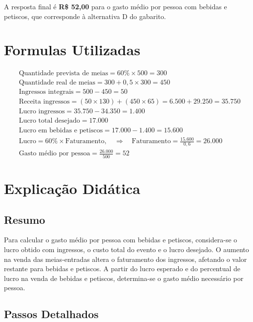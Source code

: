 \documentclass{article}
\begin{document}
A resposta final é \textbf{R\$ 52,00} para o gasto médio por pessoa com bebidas e petiscos, que corresponde à alternativa D do gabarito.

\section*{Formulas Utilizadas}

\begin{align*}
&\text{Quantidade prevista de meias} = 60\% \times 500 = 300 \\[6pt]
&\text{Quantidade real de meias} = 300 + 0{,}5 \times 300 = 450 \\[6pt]
&\text{Ingressos integrais} = 500 - 450 = 50 \\[6pt]
&\text{Receita ingressos} = (50 \times 130) + (450 \times 65) = 6.500 + 29.250 = 35.750 \\[6pt]
&\text{Lucro ingressos} = 35.750 - 34.350 = 1.400 \\[6pt]
&\text{Lucro total desejado} = 17.000 \\[6pt]
&\text{Lucro em bebidas e petiscos} = 17.000 - 1.400 = 15.600 \\[6pt]
&\text{Lucro} = 60\% \times \text{Faturamento}, \quad \Rightarrow \quad \text{Faturamento} = \frac{15.600}{0{,}6} = 26.000 \\[6pt]
&\text{Gasto médio por pessoa} = \frac{26.000}{500} = 52
\end{align*}

\section*{Explicação Didática}

\subsection*{Resumo}

Para calcular o gasto médio por pessoa com bebidas e petiscos, considera-se o lucro obtido com ingressos, o custo total do evento e o lucro desejado. O aumento na venda das meias-entradas altera o faturamento dos ingressos, afetando o valor restante para bebidas e petiscos. A partir do lucro esperado e do percentual de lucro na venda de bebidas e petiscos, determina-se o gasto médio necessário por pessoa.

\subsection*{Passos Detalhados}
\end{document}

